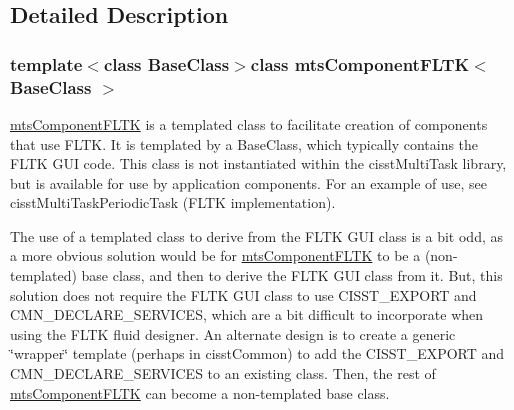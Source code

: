 \subsection{Detailed Description}
\subsubsection*{template$<$class Base\-Class$>$class mts\-Component\-F\-L\-T\-K$<$ Base\-Class $>$}

\hyperlink{classmts_component_f_l_t_k}{mts\-Component\-F\-L\-T\-K} is a templated class to facilitate creation of components that use F\-L\-T\-K. It is templated by a Base\-Class, which typically contains the F\-L\-T\-K G\-U\-I code. This class is not instantiated within the cisst\-Multi\-Task library, but is available for use by application components. For an example of use, see cisst\-Multi\-Task\-Periodic\-Task (F\-L\-T\-K implementation).

The use of a templated class to derive from the F\-L\-T\-K G\-U\-I class is a bit odd, as a more obvious solution would be for \hyperlink{classmts_component_f_l_t_k}{mts\-Component\-F\-L\-T\-K} to be a (non-\/templated) base class, and then to derive the F\-L\-T\-K G\-U\-I class from it. But, this solution does not require the F\-L\-T\-K G\-U\-I class to use C\-I\-S\-S\-T\-\_\-\-E\-X\-P\-O\-R\-T and C\-M\-N\-\_\-\-D\-E\-C\-L\-A\-R\-E\-\_\-\-S\-E\-R\-V\-I\-C\-E\-S, which are a bit difficult to incorporate when using the F\-L\-T\-K fluid designer. An alternate design is to create a generic \char`\"{}wrapper\char`\"{} template (perhaps in cisst\-Common) to add the C\-I\-S\-S\-T\-\_\-\-E\-X\-P\-O\-R\-T and C\-M\-N\-\_\-\-D\-E\-C\-L\-A\-R\-E\-\_\-\-S\-E\-R\-V\-I\-C\-E\-S to an existing class. Then, the rest of \hyperlink{classmts_component_f_l_t_k}{mts\-Component\-F\-L\-T\-K} can become a non-\/templated base class. 

